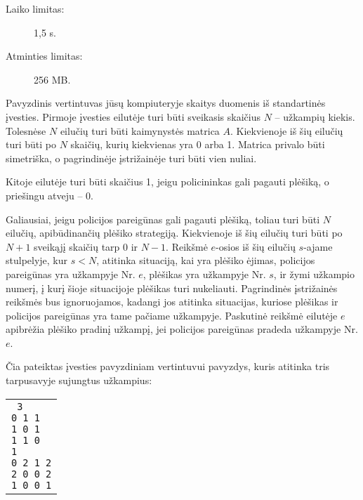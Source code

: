 \documentclass{boi2014-lt}
\begin{document}
    \begin{description}
        \item[Laiko limitas:] 1,5 s.
        \item[Atminties limitas:] 256 MB.
    \end{description}
    
    \pagebreak

    \Experimentation
	Pavyzdinis vertintuvas jūsų kompiuteryje skaitys duomenis iš standartinės
	įvesties. Pirmoje įvesties eilutėje turi būti sveikasis skaičius $N$ --
	užkampių kiekis. Tolesnėse $N$ eilučių turi būti kaimynystės matrica $A$.
	Kiekvienoje iš šių eilučių turi būti po $N$ skaičių, kurių kiekvienas yra
	0 arba 1. Matrica privalo būti simetriška, o pagrindinėje įstrižainėje
	turi būti vien nuliai.

	Kitoje eilutėje turi būti skaičius 1, jeigu policininkas gali pagauti
	plėšiką, o priešingu atveju -- 0.

	Galiausiai, jeigu policijos pareigūnas gali pagauti plėšiką, toliau turi
	būti $N$ eilučių, apibūdinančių plėšiko strategiją. Kiekvienoje iš šių
	eilučių turi būti po $N + 1$ sveikąjį skaičių tarp 0 ir $N - 1$. Reikšmė
	$e$-osios iš šių eilučių $s$-ajame stulpelyje, kur $s < N$, atitinka
	situaciją, kai yra plėšiko ėjimas, policijos pareigūnas yra užkampyje
	Nr. $e$, plėšikas yra užkampyje Nr. $s$, ir žymi užkampio numerį, į kurį
	šioje situacijoje plėšikas turi nukeliauti. Pagrindinės įstrižainės
	reikšmės bus ignoruojamos, kadangi jos atitinka situacijas, kuriose
	plėšikas ir policijos pareigūnas yra tame pačiame užkampyje. Paskutinė
	reikšmė eilutėje $e$ apibrėžia plėšiko pradinį užkampį, jei policijos
	pareigūnas pradeda užkampyje Nr. $e$.

	Čia pateiktas įvesties pavyzdiniam vertintuvui pavyzdys, kuris atitinka
	tris tarpusavyje sujungtus užkampius:

    \begin{center}
        \begin{tabular}{p{4cm}}
            {\tt
                3 \newline
                0 1 1 \newline
                1 0 1 \newline
                1 1 0 \newline
                1 \newline
                0 2 1 2 \newline
                2 0 0 2 \newline
                1 0 0 1 \newline
            }
        \end{tabular}
    \end{center}
\end{document}
